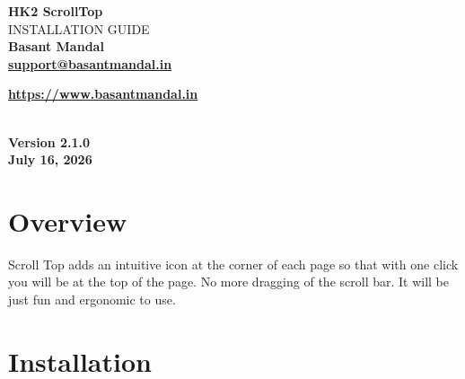 \documentclass[11pt,a4paper]{article}
\begin{document}
\begin{titlepage}
\centering

\vspace*{4cm}

{\Huge\bfseries HK2 ScrollTop}\\[0.6cm]

{\Large INSTALLATION GUIDE}\\[2.5cm]

{\Large \textbf{Basant Mandal}}\\[0.9cm]

\href{mailto:support@basantmandal.in}{\textbf{support@basantmandal.in}}

\vspace{0.3cm}

\href{https://www.basantmandal.in}{\textbf{https://www.basantmandal.in}}

\\[5cm]

{\textbf{Version 2.1.0}}\\[0.3cm]

{\textbf{July 16, 2026}}\\[4cm]

\vfill

\end{titlepage}

\tableofcontents
\newpage

\section{Overview}

Scroll Top adds an intuitive icon at the corner of each page so that with one click you will be at the top of the page. No more dragging of the scroll bar. It will be just fun and ergonomic to use.

\section{Installation}
\end{document}
